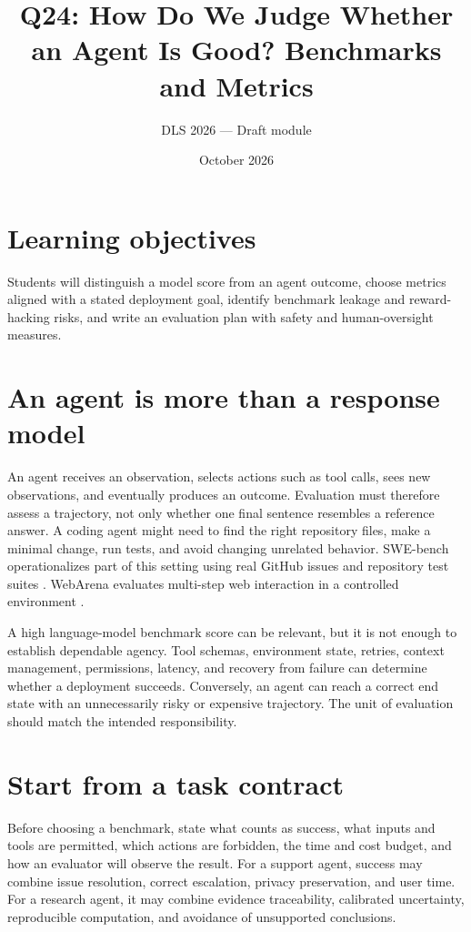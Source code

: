 \documentclass[11pt]{article}
\title{Q24: How Do We Judge Whether an Agent Is Good? Benchmarks and Metrics}
\author{DLS 2026 --- Draft module}\date{October 2026}
\begin{document}
\maketitle
\section*{Learning objectives}
Students will distinguish a model score from an agent outcome, choose metrics aligned with a stated deployment goal, identify benchmark leakage and reward-hacking risks, and write an evaluation plan with safety and human-oversight measures.

\section{An agent is more than a response model}
An agent receives an observation, selects actions such as tool calls, sees new observations, and eventually produces an outcome. Evaluation must therefore assess a trajectory, not only whether one final sentence resembles a reference answer. A coding agent might need to find the right repository files, make a minimal change, run tests, and avoid changing unrelated behavior. SWE-bench operationalizes part of this setting using real GitHub issues and repository test suites \cite{jimenez2024swebench}. WebArena evaluates multi-step web interaction in a controlled environment \cite{zhou2023webarena}.

A high language-model benchmark score can be relevant, but it is not enough to establish dependable agency. Tool schemas, environment state, retries, context management, permissions, latency, and recovery from failure can determine whether a deployment succeeds. Conversely, an agent can reach a correct end state with an unnecessarily risky or expensive trajectory. The unit of evaluation should match the intended responsibility.

\section{Start from a task contract}
Before choosing a benchmark, state what counts as success, what inputs and tools are permitted, which actions are forbidden, the time and cost budget, and how an evaluator will observe the result. For a support agent, success may combine issue resolution, correct escalation, privacy preservation, and user time. For a research agent, it may combine evidence traceability, calibrated uncertainty, reproducible computation, and avoidance of unsupported conclusions.
\end{document}
